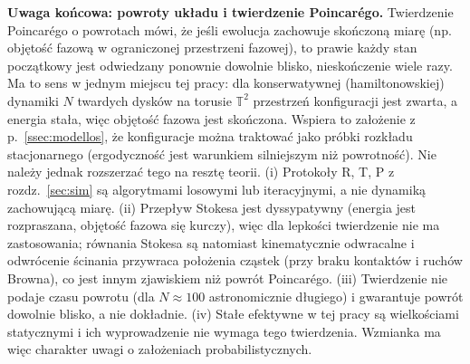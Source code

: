 \documentclass[12pt,a4paper,twoside,openright]{report}
\theoremstyle{definition}
\theoremstyle{remark}
\newcommand{\T}{\mathbb{T}}
\begin{document}
\textbf{Uwaga końcowa: powroty układu i twierdzenie Poincarégo.} Twierdzenie Poincarégo o powrotach \cite{poincare1890probleme} mówi, że jeśli ewolucja zachowuje skończoną miarę (np. objętość fazową w ograniczonej przestrzeni fazowej), to prawie każdy stan początkowy jest odwiedzany ponownie dowolnie blisko, nieskończenie wiele razy. Ma to sens w jednym miejscu tej pracy: dla konserwatywnej (hamiltonowskiej) dynamiki $N$ twardych dysków na torusie $\T^2$ przestrzeń konfiguracji jest zwarta, a energia stała, więc objętość fazowa jest skończona. Wspiera to założenie z p.~\ref{ssec:modellos}, że konfiguracje można traktować jako próbki rozkładu stacjonarnego (ergodyczność jest warunkiem silniejszym niż powrotność). Nie należy jednak rozszerzać tego na resztę teorii. (i) Protokoły R, T, P z rozdz.~\ref{sec:sim} są algorytmami losowymi lub iteracyjnymi, a nie dynamiką zachowującą miarę. (ii) Przepływ Stokesa jest dyssypatywny (energia jest rozpraszana, objętość fazowa się kurczy), więc dla lepkości twierdzenie nie ma zastosowania; równania Stokesa są natomiast kinematycznie odwracalne i odwrócenie ścinania przywraca położenia cząstek (przy braku kontaktów i ruchów Browna), co jest innym zjawiskiem niż powrót Poincarégo. (iii) Twierdzenie nie podaje czasu powrotu (dla $N\approx100$ astronomicznie długiego) i gwarantuje powrót dowolnie blisko, a nie dokładnie. (iv) Stałe efektywne w tej pracy są wielkościami statycznymi i ich wyprowadzenie nie wymaga tego twierdzenia. Wzmianka ma więc charakter uwagi o założeniach probabilistycznych.

\appendix
\end{document}

